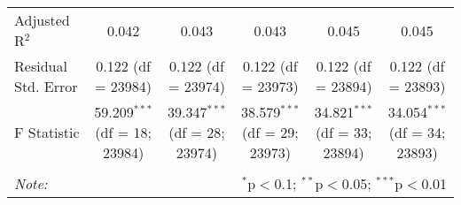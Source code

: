 \documentclass{article}
\begin{document}
\begin{table}[!htbp]
{\begin{tabular}{@{\extracolsep{5pt}}lccccc}
Adjusted R$^{2}$ & 0.042 & 0.043 & 0.043 & 0.045 & 0.045 \\ 
Residual Std. Error & 0.122 (df = 23984) & 0.122 (df = 23974) & 0.122 (df = 23973) & 0.122 (df = 23894) & 0.122 (df = 23893) \\ 
F Statistic & 59.209$^{***}$ (df = 18; 23984) & 39.347$^{***}$ (df = 28; 23974) & 38.579$^{***}$ (df = 29; 23973) & 34.821$^{***}$ (df = 33; 23894) & 34.054$^{***}$ (df = 34; 23893) \\ 
\hline 
\hline \\[-1.8ex] 
\textit{Note:}  & \multicolumn{5}{r}{$^{*}$p$<$0.1; $^{**}$p$<$0.05; $^{***}$p$<$0.01} \\ 
\end{tabular} }
\end{table} 
\end{document}

